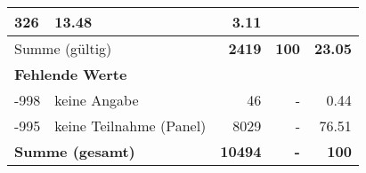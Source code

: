\begin{longtable}{lXrrr}
       \num{326} &
       \num[round-mode=places,round-precision=2]{13,48} &
         \num[round-mode=places,round-precision=2]{3,11} \\
     \midrule
     \multicolumn{2}{l}{Summe (gültig)} &
       \textbf{\num{2419}} &
     \textbf{100} &
       \textbf{\num[round-mode=places,round-precision=2]{23,05}} \\
     \multicolumn{5}{l}{\textbf{Fehlende Werte}}\\
       -998 &
       keine Angabe &
         \num{46} &
        - &
         \num[round-mode=places,round-precision=2]{0,44} \\
       -995 &
       keine Teilnahme (Panel) &
         \num{8029} &
        - &
         \num[round-mode=places,round-precision=2]{76,51} \\
     \midrule
     \multicolumn{2}{l}{\textbf{Summe (gesamt)}} &
          \textbf{\num{10494}} &
        \textbf{-} &
        \textbf{100} \\
     \bottomrule
     \end{longtable}
     
